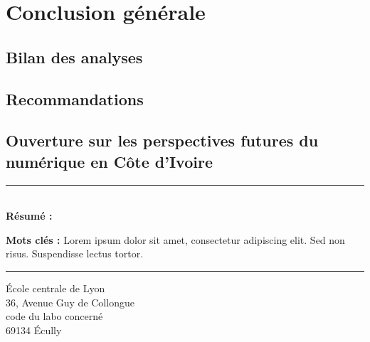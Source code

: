 
\chapter{Conclusion générale}

\section{Bilan des analyses}


\section{Recommandations}


\section{Ouverture sur les perspectives futures du numérique en Côte d’Ivoire}



%
%



\newpage
\thispagestyle{empty}

\vspace*{\fill}
\noindent\rule[2pt]{\textwidth}{0.5pt}\\
{\textbf{Résumé :}}
\lipsum[1]

{\noindent\textbf{Mots clés :}}
Lorem ipsum dolor sit amet, consectetur adipiscing elit. Sed non risus. Suspendisse lectus tortor.
\\
\noindent\rule[2pt]{\textwidth}{0.5pt}
\begin{center}
  École centrale de Lyon\\
  36, Avenue Guy de Collongue\\
  code du labo concerné\\
  69134 Écully
\end{center}
\vspace*{\fill}
